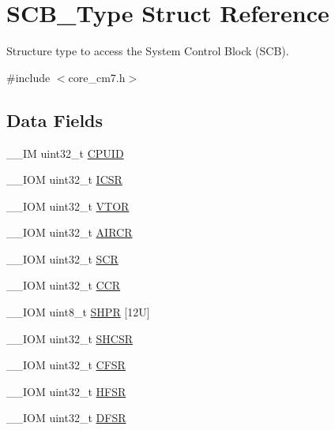 \hypertarget{structSCB__Type}{}\section{S\+C\+B\+\_\+\+Type Struct Reference}
\label{structSCB__Type}


Structure type to access the System Control Block (S\+CB).  




{\ttfamily \#include $<$core\+\_\+cm7.\+h$>$}

\subsection*{Data Fields}
\begin{DoxyCompactItemize}
\item 
\+\_\+\+\_\+\+IM uint32\+\_\+t \mbox{\hyperlink{structSCB__Type_a21e08d546d8b641bee298a459ea73e46}{C\+P\+U\+ID}}
\item 
\+\_\+\+\_\+\+I\+OM uint32\+\_\+t \mbox{\hyperlink{structSCB__Type_a0ca18ef984d132c6bf4d9b61cd00f05a}{I\+C\+SR}}
\item 
\+\_\+\+\_\+\+I\+OM uint32\+\_\+t \mbox{\hyperlink{structSCB__Type_a187a4578e920544ed967f98020fb8170}{V\+T\+OR}}
\item 
\+\_\+\+\_\+\+I\+OM uint32\+\_\+t \mbox{\hyperlink{structSCB__Type_ad3e5b8934c647eb1b7383c1894f01380}{A\+I\+R\+CR}}
\item 
\+\_\+\+\_\+\+I\+OM uint32\+\_\+t \mbox{\hyperlink{structSCB__Type_a3a4840c6fa4d1ee75544f4032c88ec34}{S\+CR}}
\item 
\+\_\+\+\_\+\+I\+OM uint32\+\_\+t \mbox{\hyperlink{structSCB__Type_a2d6653b0b70faac936046a02809b577f}{C\+CR}}
\item 
\+\_\+\+\_\+\+I\+OM uint8\+\_\+t \mbox{\hyperlink{structSCB__Type_afdab23abd301033bb318c7b188b377db}{S\+H\+PR}} \mbox{[}12\+U\mbox{]}
\item 
\+\_\+\+\_\+\+I\+OM uint32\+\_\+t \mbox{\hyperlink{structSCB__Type_a7b5ae9741a99808043394c4743b635c4}{S\+H\+C\+SR}}
\item 
\+\_\+\+\_\+\+I\+OM uint32\+\_\+t \mbox{\hyperlink{structSCB__Type_a0cda9e061b42373383418663092ad19a}{C\+F\+SR}}
\item 
\+\_\+\+\_\+\+I\+OM uint32\+\_\+t \mbox{\hyperlink{structSCB__Type_a14ad254659362b9752c69afe3fd80934}{H\+F\+SR}}
\item 
\+\_\+\+\_\+\+I\+OM uint32\+\_\+t \mbox{\hyperlink{structSCB__Type_a191579bde0d21ff51d30a714fd887033}{D\+F\+SR}}
\item 

\end{DoxyCompactItemize}
